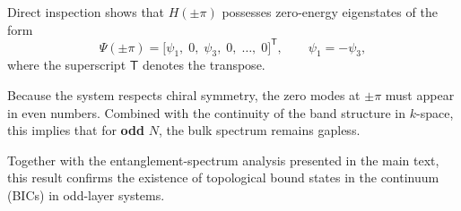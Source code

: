 \documentclass[twocolumn,english,prl,epsfig,rotate,showpacs,aps, superscriptaddress]{revtex4-2}
\begin{document}
Direct inspection shows that $H(\pm\pi)$ possesses zero-energy eigenstates of the form
\begin{equation}
\Psi(\pm\pi) = \bigl[ \psi_1,\;0,\;\psi_3,\;0,\;\dots,\;0 \bigr]^{\!\mathsf{T}},
\qquad \psi_1 = -\psi_3,
\label{eq:zero_mode}
\end{equation}
where the superscript $\mathsf{T}$ denotes the transpose.

Because the system respects chiral symmetry, the zero modes at $\pm\pi$ must appear in even numbers. Combined with the continuity of the band structure in $k$-space, this implies that for \textbf{odd} $N$, the bulk spectrum remains gapless.

Together with the entanglement-spectrum analysis presented in the main text, this result confirms the existence of topological bound states in the continuum (BICs) in odd-layer systems.
\end{document}
